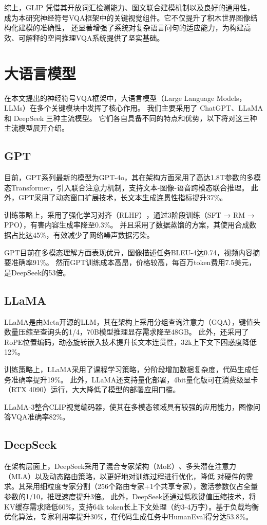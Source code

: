 综上，GLIP 凭借其开放词汇检测能力、图文联合建模机制以及良好的通用性，
成为本研究神经符号VQA框架中的关键视觉组件。它不仅提升了积木世界图像结构化建模的准确性，
还显著增强了系统对复杂语言问句的适应能力，为构建高效、可解释的空间推理VQA系统提供了坚实基础。
\section{大语言模型}
在本文提出的神经符号VQA框架中，大语言模型（Large Language Models， LLMs）在多个关键模块中发挥了核心作用。
我们主要采用了 ChatGPT、LLaMA 和 DeepSeek 三种主流模型。
它们各自具备不同的特点和优势，以下将对这三种主流模型展开介绍。
\subsection{GPT}
目前，GPT系列最新的模型为GPT-4o，其在架构方面采用了高达1.8T参数的多模态Transformer，引入联合注意力机制，支持文本-图像-语音跨模态联合推理。
此外，GPT采用了动态窗口扩展技术，长文本生成连贯性指标提升37\%。

训练策略上，采用了强化学习对齐（RLHF）​，通过3阶段训练（SFT → RM → PPO），有害内容生成率降至0.3\%。
并且采用了​数据蒸馏的方案，其使用合成数据占比达45\%，有效减少了网络噪声数据污染。

GPT目前在​多模态理解方面表现优异，图像描述任务BLEU-4达0.74，视频内容摘要准确率91\%。
然而GPT训练成本高昂，价格较高，每百万token费用7.5美元，是DeepSeek的53倍。
\subsection{LLaMA}
LLaMA是由Meta开源的LLM，其在架构上采用​分组查询注意力（GQA），​键值头数量压缩至查询头的1/4，70B模型推理显存需求降至48GB。
此外，还采用了​RoPE位置编码，动态旋转嵌入技术提升长文本连贯性，32k上下文下困惑度降低12\%。

训练策略上，LLaMA​采用了课程学习策略，分阶段增加数据复杂度，代码生成任务准确率提升19\%。
此外，LLaMA还支持​量化部署，4bit量化版可在消费级显卡（RTX 4090）运行，大大降低了模型的部署应用门槛。

​LLaMA-3整合CLIP视觉编码器，使其在多模态领域具有较强的应用能力，图像问答VQA准确率82\%。
\subsection{DeepSeek}
在架构层面上，DeepSeek采用了混合专家架构（MoE）​、​多头潜在注意力（MLA）以及动态路由策略，以更好地对训练过程进行优化，降低
对硬件的需求。其采用细粒度专家分割（256个路由专家+1个共享专家），激活参数仅占全量参数的1/10，推理速度提升3倍。
此外，DeepSeek还通过低秩键值压缩技术，将KV缓存需求降低60\%，支持64k token长上下文处理（约3-4万字）。基于负载均衡优化算法，专家利用率提升30\%，在代码生成任务中HumanEval得分达53.8\%。

